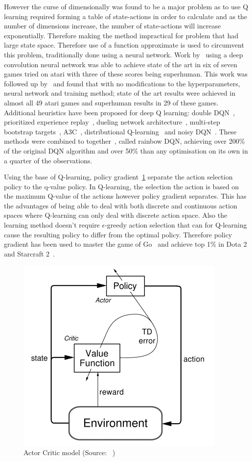 However the curse of dimensionally was found to be a major problem as to use Q learning required
forming a table of state-actions in order to calculate and as the number of dimensions increase, the number of
state-actions will increase exponentially. Therefore making the method impractical for problem that had large state
space. Therefore use of a function approximate is used to circumvent this problem, traditionally done using a neural
network. Work by~\cite{atari} using a deep convolution neural network was able to achieve state of the art in six of seven
games tried on atari with three of these scores being superhuman. This work was followed up by~\cite{mnih2015humanlevel}
and found that with no modifications to the hyperparameters, neural network and training method; state of the art results were
achieved in almost all 49 atari games and superhuman results in 29 of these games. Additional heuristics have been
proposed for deep Q learning: double DQN~\citep{doubledqn}, prioritized experience replay~\citep{prioritizedexperiencereplay},
dueling network architecture~\citep{duelingdqn}, multi-step bootstrap targets~\citep{multi-step-dqn, Sutton1998},
A3C~\cite{A3C}, distributional Q-learning~\citep{distributional_dqn} and noisy DQN~\citep{noisy_dqn}. These methods were
combined to together~\cite{rainbow}, called rainbow DQN, achieving over 200\% of the original DQN algorithm and over
50\% than any optimisation on its own in a quarter of the observations.

Using the base of Q-learning, policy gradient~\ref{fig:actor-critic-model} separate the action selection policy to the
q-value policy. In Q-learning, the selection the action is based on the maximum Q-value of the actions however policy
gradient separates. This has the advantages of being able to deal with both discrete and continuous action spaces where
Q-learning can only deal with discrete action space. Also the learning method doesn't require $\epsilon$-greedy action
selection that can for Q-learning cause the resulting policy to differ from the optimal policy. Therefore policy
gradient has been used to master the game of Go~\citep{silver2017mastering} and achieve top 1\% in
Dota 2~\citep{OpenAI_dota} and Starcraft 2~\citep{starcraft2}.

\begin{figure}
    \includegraphics{figures/actor-critic.png}
    \caption{Actor Critic model (Source: ~\cite{Sutton1998})}
    \label{fig:actor-critic-model}
\end{figure}